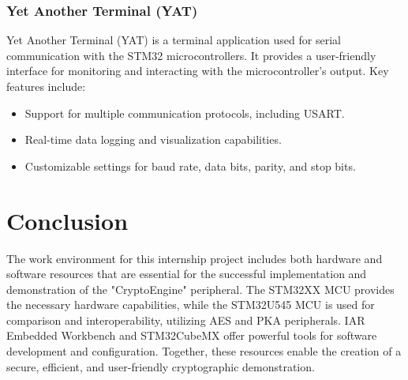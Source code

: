 \subsubsection{Yet Another Terminal (YAT)}
Yet Another Terminal (YAT) is a terminal application used for serial communication with the STM32 microcontrollers. It provides a user-friendly interface for monitoring and interacting with the microcontroller's output. Key features include:
\begin{itemize}
    \item Support for multiple communication protocols, including USART.
    \item Real-time data logging and visualization capabilities.
    \item Customizable settings for baud rate, data bits, parity, and stop bits.
\end{itemize}
\section*{Conclusion}
The work environment for this internship project includes both hardware and software resources that are essential for the successful implementation and demonstration of the "CryptoEngine" peripheral. The STM32XX MCU provides the necessary hardware capabilities, while the STM32U545 MCU is used for comparison and interoperability, utilizing AES and PKA peripherals. IAR Embedded Workbench and STM32CubeMX offer powerful tools for software development and configuration. Together, these resources enable the creation of a secure, efficient, and user-friendly cryptographic demonstration.
